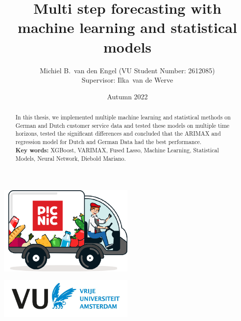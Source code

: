 \documentclass[hidelinks, a4paper,12pt]{article}
\title{Multi step forecasting with machine learning and statistical models}
\author{
    Michiel B.\ van den Engel
    (VU Student Number: 2612085)
    \\[2ex]
    Supervisor: Ilka\ van de Werve\\
    }
\date{Autumn 2022}
\begin{document}
\maketitle

\begin{abstract}
\noindent In this thesis, we implemented multiple machine learning and statistical methods on German and Dutch customer service data and tested these models on multiple time horizons, tested the significant differences and concluded that the ARIMAX and regression model for Dutch and German Data had the best performance.\\[1ex]
\noindent\textbf{Key words: } XGBoost, VARIMAX, Fused Lasso, Machine Learning, Statistical Models, Neural Network, Diebold Mariano. 
\end{abstract}

\vfill
\centerline{\includegraphics[width=0.5\textwidth]{picnic_auto.png}}
\vfill
\centerline{\includegraphics[width=0.5\textwidth]{VU_logo.jpg}}
\clearpage
\tableofcontents
\newpage








\newpage
\appendix



\newpage


\end{document}
